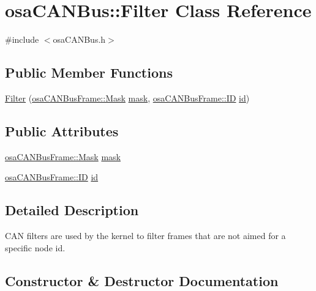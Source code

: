 \hypertarget{classosa_c_a_n_bus_1_1_filter}{}\section{osa\+C\+A\+N\+Bus\+:\+:Filter Class Reference}
\label{classosa_c_a_n_bus_1_1_filter}


{\ttfamily \#include $<$osa\+C\+A\+N\+Bus.\+h$>$}

\subsection*{Public Member Functions}
\begin{DoxyCompactItemize}
\item 
\hyperlink{classosa_c_a_n_bus_1_1_filter_ae14c86ff803ed277d819e011e23723c6}{Filter} (\hyperlink{classosa_c_a_n_bus_frame_a28c1ee7996aa3559ed24871ab5bd9d0d}{osa\+C\+A\+N\+Bus\+Frame\+::\+Mask} \hyperlink{classosa_c_a_n_bus_1_1_filter_a1218f9d1c03b7eb50cc7cfb993b327ac}{mask}, \hyperlink{classosa_c_a_n_bus_frame_ae917bcfe6427b2055a405716909c6048}{osa\+C\+A\+N\+Bus\+Frame\+::\+I\+D} \hyperlink{classosa_c_a_n_bus_1_1_filter_a20b3abd77672b5fd1fc09dc19ad72f8f}{id})
\end{DoxyCompactItemize}
\subsection*{Public Attributes}
\begin{DoxyCompactItemize}
\item 
\hyperlink{classosa_c_a_n_bus_frame_a28c1ee7996aa3559ed24871ab5bd9d0d}{osa\+C\+A\+N\+Bus\+Frame\+::\+Mask} \hyperlink{classosa_c_a_n_bus_1_1_filter_a1218f9d1c03b7eb50cc7cfb993b327ac}{mask}
\item 
\hyperlink{classosa_c_a_n_bus_frame_ae917bcfe6427b2055a405716909c6048}{osa\+C\+A\+N\+Bus\+Frame\+::\+I\+D} \hyperlink{classosa_c_a_n_bus_1_1_filter_a20b3abd77672b5fd1fc09dc19ad72f8f}{id}
\end{DoxyCompactItemize}


\subsection{Detailed Description}
C\+A\+N filters are used by the kernel to filter frames that are not aimed for a specific node id. 

\subsection{Constructor \& Destructor Documentation}
\hypertarget{classosa_c_a_n_bus_1_1_filter_ae14c86ff803ed277d819e011e23723c6}{}
